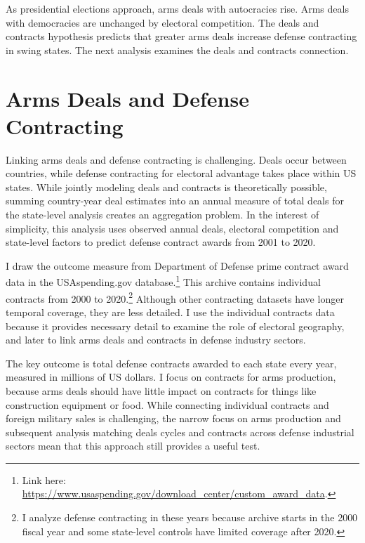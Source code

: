 \documentclass[12pt]{article}
\begin{document}
As presidential elections approach, arms deals with autocracies rise. 
Arms deals with democracies are unchanged by electoral competition.
The deals and contracts hypothesis predicts that greater arms deals increase defense contracting in swing states. 
The next analysis examines the deals and contracts connection.


\section{Arms Deals and Defense Contracting}


Linking arms deals and defense contracting is challenging. 
Deals occur between countries, while defense contracting for electoral advantage takes place within US states.
While jointly modeling deals and contracts is theoretically possible, summing country-year deal estimates into an annual measure of total deals for the state-level analysis creates an aggregation problem. %
In the interest of simplicity, this analysis uses observed annual deals, electoral competition and state-level factors to predict defense contract awards from 2001 to 2020. 


I draw the outcome measure from Department of Defense prime contract award data in the USAspending.gov database.\footnote{Link here: \url{https://www.usaspending.gov/download_center/custom_award_data}.} 
This archive contains individual contracts from 2000 to 2020.\footnote{I analyze defense contracting in these years because archive starts in the 2000 fiscal year and some state-level controls have limited coverage after 2020.}
Although other contracting datasets have longer temporal coverage, they are less detailed.
I use the individual contracts data because it provides necessary detail to examine the role of electoral geography, and later to link arms deals and contracts in defense industry sectors. 


The key outcome is total defense contracts awarded to each state every year, measured in millions of US dollars.
I focus on contracts for arms production, because arms deals should have little impact on contracts for things like construction equipment or food.
While connecting individual contracts and foreign military sales is challenging, the narrow focus on arms production and subsequent analysis matching deals cycles and contracts across defense industrial sectors mean that this approach still provides a useful test. 
\end{document}
